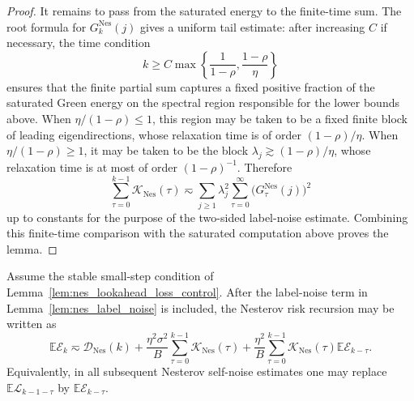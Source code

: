 \begin{proof}
It remains to pass from the saturated energy to the finite-time sum.  The root formula for
\(G_k^{\mathrm{Nes}}(j)\) gives a uniform tail estimate: after increasing \(C\) if necessary, the time
condition
\[
    k\ge
    C\max\left\{\frac1{1-\rho},\frac{1-\rho}{\eta}\right\}
\]
ensures that the finite partial sum captures a fixed positive fraction of the saturated Green energy on the
spectral region responsible for the lower bounds above.  When \(\eta/(1-\rho)\le1\), this region may be
taken to be a fixed finite block of leading eigendirections, whose relaxation time is of order
\((1-\rho)/\eta\).  When \(\eta/(1-\rho)\ge1\), it may be taken to be the block
\(\lambda_j\gtrsim(1-\rho)/\eta\), whose relaxation time is at most of order \((1-\rho)^{-1}\).
Therefore
\[
    \sum_{\tau=0}^{k-1}\mathcal K_{\mathrm{Nes}}(\tau)
    \eqsim
    \sum_{j\ge1}\lambda_j^2
    \sum_{\tau=0}^{\infty}\bigl(G_\tau^{\mathrm{Nes}}(j)\bigr)^2
\]
up to constants for the purpose of the two-sided label-noise estimate.  Combining this finite-time
comparison with the saturated computation above proves the lemma.
\end{proof}

\begin{lemma}
\label{lem:nes_replace_lookahead_by_next_loss}
Assume the stable small-step condition of Lemma~\ref{lem:nes_lookahead_loss_control}.  After the label-noise
term in Lemma~\ref{lem:nes_label_noise} is included, the Nesterov risk recursion may be written as
\[
    \mathbb{E}\mathcal E_k
    \eqsim
    \mathcal D_{\mathrm{Nes}}(k)
    +
    \frac{\eta^2\sigma^2}{B}\sum_{\tau=0}^{k-1}\mathcal K_{\mathrm{Nes}}(\tau)
    +
    \frac{\eta^2}{B}\sum_{\tau=0}^{k-1}\mathcal K_{\mathrm{Nes}}(\tau)
    \mathbb{E}\mathcal E_{k-\tau}.
\]
Equivalently, in all subsequent Nesterov self-noise estimates one may replace
\(\mathbb{E}\mathcal L_{k-1-\tau}\) by \(\mathbb{E}\mathcal E_{k-\tau}\).
\end{lemma}


